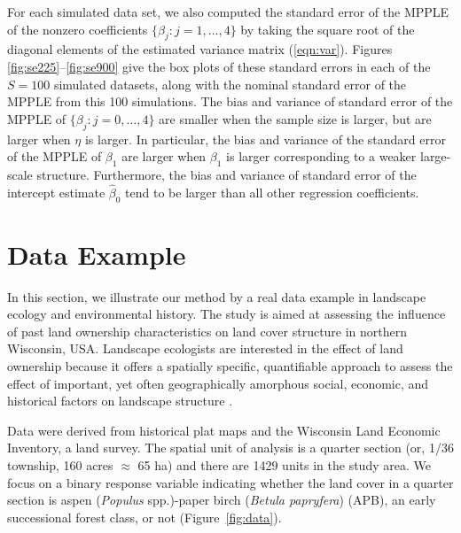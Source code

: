 \documentclass[authoryear,review, 12pt]{elsarticle}
\begin{document}
For each simulated data set, we also computed the standard error of the  MPPLE of the nonzero coefficients $\{\beta_j: j=1,\ldots,4\}$ by taking the square root of the diagonal elements of the estimated variance matrix (\ref{eqn:var}). Figures \ref{fig:se225}--\ref{fig:se900} give the box plots of these standard errors in each of the $S=100$ simulated datasets, along with the nominal standard error of the MPPLE from this 100 simulations.
The bias and variance of standard error of the  MPPLE of $\{\beta_j: j=0,\ldots, 4\}$ are smaller when the sample size is larger,
but are larger when $\eta$ is larger.
In particular, the bias and variance of the standard error of the  MPPLE of  ${\beta}_1$ are larger when $\beta_1$ is larger corresponding to a weaker large-scale structure.  Furthermore, the bias and variance of standard error of the intercept estimate $\widehat{\beta}_0$ tend to be larger than all other regression coefficients.


\section{Data Example}
\label{sec:data}

In this section, we illustrate our method by a real data example in landscape ecology and environmental history.  The study is aimed at assessing the influence of past land ownership characteristics on land cover structure in northern Wisconsin, USA. Landscape ecologists are interested in the effect of land ownership because it offers a spatially specific, quantifiable approach to assess the effect of important, yet often geographically amorphous social, economic, and historical factors on landscape structure \citep{turnerw96}.  

Data were derived from historical plat maps and the Wisconsin Land Economic Inventory, a land survey. The spatial unit of analysis is a quarter section (or, 1/36 township, 160 acres $\approx$ 65 ha) and there are 1429 units in the study area. We focus on a binary response variable indicating whether the land cover in a quarter section  is aspen (\textit{Populus} spp.)-paper birch (\textit{Betula papryfera}) (APB), an early successional forest class, or not (Figure~\ref{fig:data}). 
\end{document}
